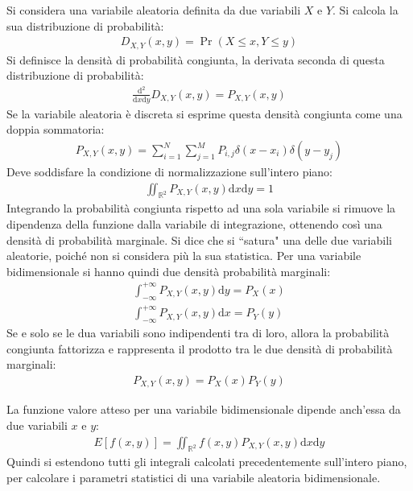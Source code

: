 \documentclass{article}
\newcommand{\df}{\mathrm{d}}
\numberwithin{equation}{subsection}
\begin{document}
Si considera una variabile aleatoria definita da due variabili $X$ e $Y$. Si calcola la sua distribuzione di probabilità:
\begin{gather}
    D_{X,Y}(x,y)=\Pr(X\leq x,Y\leq y)
\end{gather}
Si definisce la densità di probabilità congiunta, la derivata seconda di questa distribuzione di probabilità:
\begin{gather}
    \displaystyle\frac{\df^2}{\df x\df y}D_{X,Y}(x,y)=P_{X,Y}(x,y)
\end{gather}
Se la variabile aleatoria è discreta si esprime questa densità congiunta come una doppia sommatoria:
\begin{gather*}
    P_{X,Y}(x,y)=\displaystyle\sum_{i=1}^N\sum_{j=1}^MP_{i,j}\delta(x-x_i)\delta(y-y_j)
\end{gather*}
Deve soddisfare la condizione di normalizzazione sull'intero piano:
\begin{gather}
    \iint_{\mathbb{R}^2}P_{X,Y}(x,y)\df x\df y=1
\end{gather}
Integrando la probabilità congiunta rispetto ad una sola variabile si rimuove la dipendenza della funzione 
dalla variabile di integrazione, ottenendo così una densità di probabilità marginale. Si dice che si ``satura" una delle due variabili aleatorie, poiché non si considera più la sua statistica. Per una variabile 
bidimensionale si hanno quindi due densità probabilità marginali:
\begin{gather}
    \displaystyle\int_{-\infty}^{+\infty}P_{X,Y}(x,y)\df y=P_X(x)\\
    \displaystyle\int_{-\infty}^{+\infty}P_{X,Y}(x,y)\df x=P_Y(y)
\end{gather}
Se e solo se le dua variabili sono indipendenti tra di loro, allora la probabilità congiunta fattorizza e rappresenta il prodotto tra le due densità di probabilità marginali:
\begin{gather}
    P_{X,Y}(x,y)=P_X(x)P_Y(y)
\end{gather}

La funzione valore atteso per una variabile bidimensionale dipende anch'essa da due variabili $x$ e $y$:
\begin{gather}
    E[f(x,y)]=\displaystyle\iint_{\mathbb{R}^2}f(x,y)P_{X,Y}(x,y)\df x\df y
\end{gather}
Quindi si estendono tutti gli integrali calcolati precedentemente sull'intero piano, per calcolare i parametri statistici di una variabile aleatoria bidimensionale. 
\end{document}
